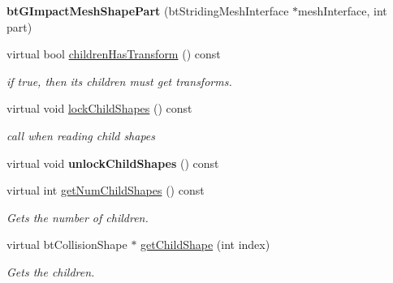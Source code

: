 \begin{DoxyCompactItemize}
\item 
\mbox{\label{classbtGImpactMeshShapePart_a2e3ad6d2af64c321af6ce23e16aa2828}} 
{\bfseries bt\+G\+Impact\+Mesh\+Shape\+Part} (bt\+Striding\+Mesh\+Interface $\ast$mesh\+Interface, int part)
\item 
\mbox{\label{classbtGImpactMeshShapePart_abef102fb9c45e2361e669febee12c0fa}} 
virtual bool \hyperlink{classbtGImpactMeshShapePart_abef102fb9c45e2361e669febee12c0fa}{children\+Has\+Transform} () const
\begin{DoxyCompactList}\small\item\em if true, then its children must get transforms. \end{DoxyCompactList}\item 
\mbox{\label{classbtGImpactMeshShapePart_a4519e7264ea6706494ebf3a14c8ae7b9}} 
virtual void \hyperlink{classbtGImpactMeshShapePart_a4519e7264ea6706494ebf3a14c8ae7b9}{lock\+Child\+Shapes} () const
\begin{DoxyCompactList}\small\item\em call when reading child shapes \end{DoxyCompactList}\item 
\mbox{\label{classbtGImpactMeshShapePart_a94ab5cef0d8917b442618bba2ac8f054}} 
virtual void {\bfseries unlock\+Child\+Shapes} () const
\item 
\mbox{\label{classbtGImpactMeshShapePart_a7194568862ec4430cb9f93a182215f88}} 
virtual int \hyperlink{classbtGImpactMeshShapePart_a7194568862ec4430cb9f93a182215f88}{get\+Num\+Child\+Shapes} () const
\begin{DoxyCompactList}\small\item\em Gets the number of children. \end{DoxyCompactList}\item 
\mbox{\label{classbtGImpactMeshShapePart_a9dfb2b28e136ec3b08127f6b47cefb89}} 
virtual bt\+Collision\+Shape $\ast$ \hyperlink{classbtGImpactMeshShapePart_a9dfb2b28e136ec3b08127f6b47cefb89}{get\+Child\+Shape} (int index)
\begin{DoxyCompactList}\small\item\em Gets the children. \end{DoxyCompactList}\item 

\end{DoxyCompactItemize}
